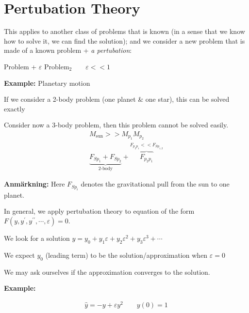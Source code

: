 \section{Pertubation Theory}\par
\noindent This applies to another class of problems that is known (in a sense that we know how to solve it, we can find the solution); and we consider a new problem that is made of a known problem + \textit{a pertubation}:\par
\begin{center}
  Problem + $\varepsilon$ Problem$_2\qquad \varepsilon << 1$
\end{center}
\par\bigskip
\noindent\textbf{Example:} Planetary motion\par
\noindent If we consider a 2-body problem (one planet \& one star), this can be solved exactly\par
\noindent Consider now a 3-body problem, then this problem cannot be solved easily.
\begin{equation*}
  \begin{gathered}
    M_{\text{sun}} >> M_{p_1} M_{p_2}\\
    \underbrace{F_{Sp_1}+F_{Sp_2}}_{\text{2-body}}+\overbrace{F_{p_2p_1}}^{\text{$F_{p_2p_1}<< F_{Sp_{1,2}}$}}
  \end{gathered}
\end{equation*}
\par\bigskip
\noindent\textbf{Anmärkning:} Here $F_{Sp_i}$ denotes the gravitational pull from the sun to one planet.
\par\bigskip
\noindent In general, we apply pertubation theory to equation of the form $F(y,y^{\prime},y^{\prime\prime},\cdots,\varepsilon)=0$.\par
\noindent We look for a solution $y = y_0+y_1\varepsilon+y_2\varepsilon^2+y_3\varepsilon^3+\cdots$\par
\noindent We expect $y_0$ (leading term) to be the solution/approximation when $\varepsilon=0$ 
\par\bigskip
\noindent We may ask ourselves if the approximation converges to the solution.
\par\bigskip
\noindent\textbf{Example:}\par
\begin{equation*}
  \begin{gathered}
    \hat{y} = -y+\varepsilon y^2\qquad y(0) = 1
  \end{gathered}
\end{equation*}
